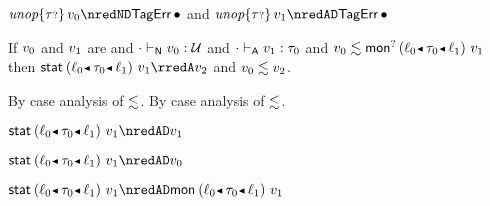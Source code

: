{\begin{lamportproof*}
    \begin{pfproof}
      \qedstep
        \begin{pfproof}
          {$\eunopt{\stoptional}{\svalue_0} \nredND \tagerrorD$}
          and 
          {$\eunopt{\stoptional}{\svalue_1} \nredAD \tagerrorD$}
        \end{pfproof}
    \end{pfproof}

\end{lamportproof*}}

\begin{lemma}\label{A-sta-mopt}
  If\/ $v_0$ and\/ $v_1$ are \reducedsurfaceexpressions{}
  and\/ ${\cdot} \vdash_{\mathsf{N}} v_0 : {\mathcal U}$
  and\/ ${\cdot} \vdash_{\mathsf{A}} v_1 : \tau_0$
  and\/ $\rexpr{\svalue_0}{\emopt{\obnd{\sowner_0}{\stype_0}{\sowner_1}}{\svalue_1}}$
  then\/ $\estab{\obnd{\sowner_0}{\stype_0}{\sowner_1}}{\svalue_1} \rredA \svalue_2$
  and\/ $v_0 \lesssim v_2$.
\end{lemma}{
  \newcommand{\shortpf}{By case analysis of $\srexpr$.}
\begin{lamportproof*}
  \shortpf
\mainproof
  \shortpf

    \begin{pfproof}
      \qedstep
        \begin{pfproof}
          $\estab{\obnd{\sowner_0}{\stype_0}{\sowner_1}}{\svalue_1} \nredAD \svalue_1$
        \end{pfproof}
    \end{pfproof}

    \begin{pfproof}
      \qedstep
        \begin{pfproof}
          $\estab{\obnd{\sowner_0}{\stype_0}{\sowner_1}}{\svalue_1} \nredAD \svalue_0$
        \end{pfproof}
    \end{pfproof}

    \begin{pfproof}
      \qedstep
        \begin{pfproof}
          $\estab{\obnd{\sowner_0}{\stype_0}{\sowner_1}}{\svalue_1} \nredAD \emon{\obnd{\sowner_0}{\stype_0}{\sowner_1}}{\svalue_1}$
        \end{pfproof}
    \end{pfproof}


\end{lamportproof*}}
